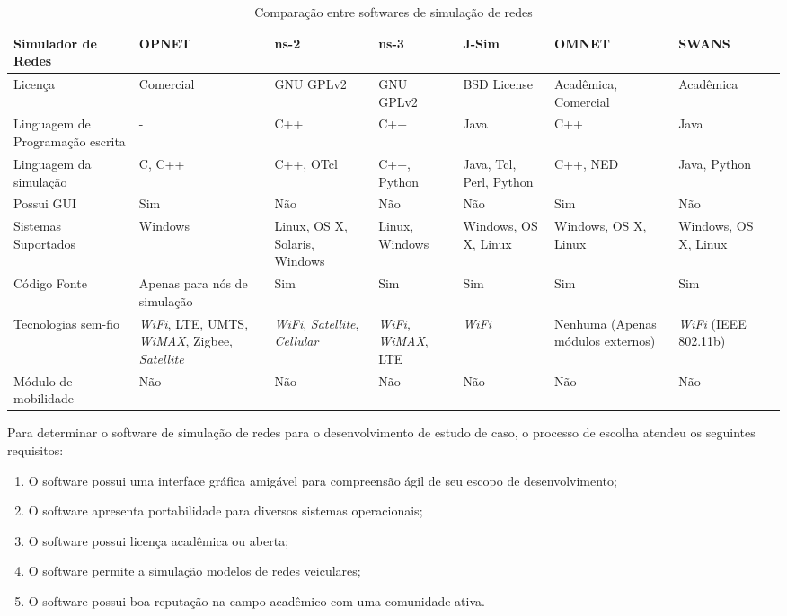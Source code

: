 \documentclass[
12pt,				%
openright,			%
oneside,			%
a4paper,			%
brazil,				%
]{abntex2}
\begin{document}
	\begin{table}[H]
		\renewcommand{\arraystretch}{1.5}
		\centering
		\begin{tabular}{|p{1.97cm}|p{1.72cm}|p{1.73cm}|p{1.66cm}|p{1.66cm}|p{1.77cm}|p{1.78cm}|p{1.77cm}|}
			\hline
			{\textbf{Simulador de Redes}} & \textbf{OPNET} & {\textbf{ns-2}} & {\textbf{ns-3}} & \textbf{J-Sim} & \textbf{OMNET} & \textbf{SWANS} \\ \hline
			Licença & Comercial & GNU GPLv2 & GNU GPLv2 & BSD License & Acadêmica, Comercial & Acadêmica \\ \hline
			Linguagem de Programação escrita & - & C++ & C++ & Java & C++ & Java \\ \hline
			Linguagem da simulação & C, C++ & C++, OTcl & C++, Python & Java, Tcl, Perl, Python & C++, NED & Java, Python \\ \hline
			Possui GUI & Sim & Não & Não & Não & Sim & Não \\ \hline
			Sistemas Suportados & Windows & Linux, OS X, Solaris, Windows & Linux, Windows & Windows, OS X, Linux & Windows, OS X, Linux & Windows, OS X, Linux \\ \hline
			Código Fonte & Apenas para nós de simulação & Sim & Sim & Sim & Sim & Sim \\ \hline
			Tecnologias sem-fio & \textit{WiFi}, LTE, UMTS, \textit{WiMAX}, Zigbee, \textit{Satellite} & \textit{WiFi}, \textit{Satellite}, \textit{Cellular} & \textit{WiFi}, \textit{WiMAX}, LTE & \textit{WiFi} & Nenhuma (Apenas módulos externos) & \textit{WiFi} (IEEE 802.11b)  \\ \hline
			Módulo de mobilidade & Não & Não & Não & Não & Não & Não \\ 
			\hline
		\end{tabular}
			\caption{Comparação entre softwares de simulação de redes}
			\label{tab_5}				
	\end{table}

	\par Para determinar o software de simulação de redes para o desenvolvimento de estudo de caso, o processo de escolha atendeu os seguintes requisitos:
	
	\begin{enumerate}
		\item O software possui uma interface gráfica amigável para compreensão ágil de seu escopo de desenvolvimento;
		\item O software apresenta portabilidade para diversos sistemas operacionais;
		\item O software possui licença acadêmica ou aberta;
		\item O software permite a simulação modelos de redes veiculares;
		\item O software possui boa reputação na campo acadêmico com uma comunidade ativa.
	\end{enumerate}
	
\end{document}

